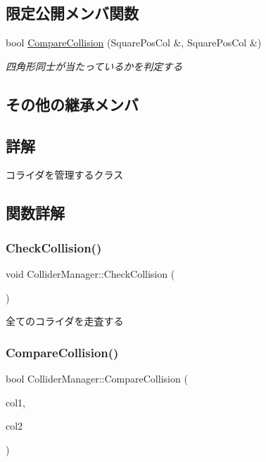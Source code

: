 \subsection*{限定公開メンバ関数}
\begin{DoxyCompactItemize}
\item 
bool \mbox{\hyperlink{class_collider_manager_a54d3bd3259f15d1554de953127d4d5c7}{Compare\+Collision}} (Square\+Pos\+Col \&, Square\+Pos\+Col \&)
\begin{DoxyCompactList}\small\item\em 四角形同士が当たっているかを判定する \end{DoxyCompactList}\end{DoxyCompactItemize}
\subsection*{その他の継承メンバ}


\subsection{詳解}
コライダを管理するクラス 

\subsection{関数詳解}
\mbox{\label{class_collider_manager_af3863143e206b4c86c8b89dd91ff3c8c}} 
\subsubsection{\texorpdfstring{Check\+Collision()}{CheckCollision()}}
{\footnotesize\ttfamily void Collider\+Manager\+::\+Check\+Collision (\begin{DoxyParamCaption}{ }\end{DoxyParamCaption})}



全てのコライダを走査する 

\mbox{\label{class_collider_manager_a54d3bd3259f15d1554de953127d4d5c7}} 
\subsubsection{\texorpdfstring{Compare\+Collision()}{CompareCollision()}}
{\footnotesize\ttfamily bool Collider\+Manager\+::\+Compare\+Collision (\begin{DoxyParamCaption}\item[{Square\+Pos\+Col \&}]{col1,  }\item[{Square\+Pos\+Col \&}]{col2 }\end{DoxyParamCaption})\hspace{0.3cm}{\ttfamily [protected]}}



